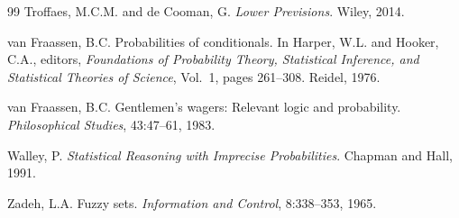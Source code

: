 \documentclass[11pt,a4paper]{article}
\begin{document}
\begin{thebibliography}{99}
Troffaes, M.C.M. and de Cooman, G.
\newblock \emph{Lower Previsions}.
\newblock Wiley, 2014.

van Fraassen, B.C.
\newblock Probabilities of conditionals.
\newblock In Harper, W.L. and Hooker, C.A., editors, \emph{Foundations of Probability Theory, Statistical Inference, and Statistical Theories of Science},
Vol.~1, pages 261--308. Reidel, 1976.

van Fraassen, B.C.
\newblock Gentlemen's wagers: Relevant logic and probability.
\newblock \emph{Philosophical Studies}, 43:47--61, 1983.

Walley, P.
\newblock \emph{Statistical Reasoning with Imprecise Probabilities}.
\newblock Chapman and Hall, 1991.

Zadeh, L.A.
\newblock Fuzzy sets.
\newblock \emph{Information and Control}, 8:338--353, 1965.

\end{thebibliography}
\end{document}
